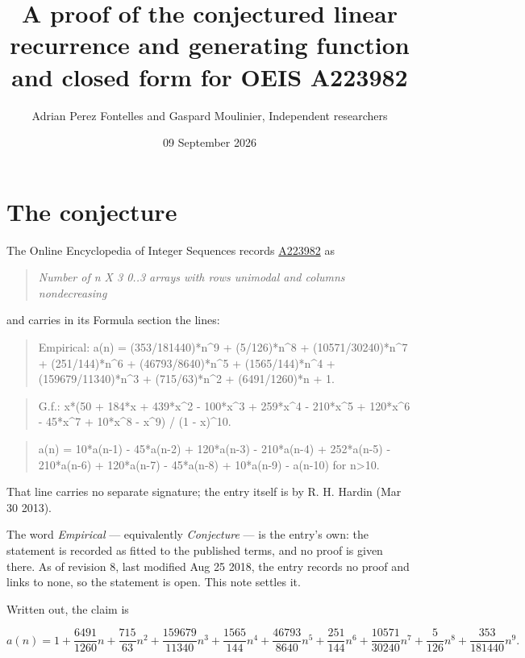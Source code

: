 \documentclass[11pt]{article}
\title{A proof of the conjectured linear recurrence and generating function and closed form for OEIS A223982}
\author{Adrian Perez Fontelles and Gaspard Moulinier, Independent researchers}
\date{09 September 2026}
\theoremstyle{definition}
\begin{document}
\maketitle
\section{The conjecture}

The Online Encyclopedia of Integer Sequences records \href{https://oeis.org/A223982}{A223982} as

\begin{quote}\itshape Number of n X 3 0..3 arrays with rows unimodal and columns nondecreasing\end{quote}

and carries in its Formula section the lines:

\begin{quote}\ttfamily Empirical: a(n) = (353/181440)*n\textasciicircum{}9 + (5/126)*n\textasciicircum{}8 + (10571/30240)*n\textasciicircum{}7 + (251/144)*n\textasciicircum{}6 + (46793/8640)*n\textasciicircum{}5 + (1565/144)*n\textasciicircum{}4 + (159679/11340)*n\textasciicircum{}3 + (715/63)*n\textasciicircum{}2 + (6491/1260)*n + 1.\end{quote}

\begin{quote}\ttfamily G.f.: x*(50 + 184*x + 439*x\textasciicircum{}2 - 100*x\textasciicircum{}3 + 259*x\textasciicircum{}4 - 210*x\textasciicircum{}5 + 120*x\textasciicircum{}6 - 45*x\textasciicircum{}7 + 10*x\textasciicircum{}8 - x\textasciicircum{}9) / (1 - x)\textasciicircum{}10.\end{quote}

\begin{quote}\ttfamily a(n) = 10*a(n-1) - 45*a(n-2) + 120*a(n-3) - 210*a(n-4) + 252*a(n-5) - 210*a(n-6) + 120*a(n-7) - 45*a(n-8) + 10*a(n-9) - a(n-10) for n>10.\end{quote}

That line carries no separate signature; the entry itself is by R. H. Hardin (Mar 30 2013).

The word {\itshape Empirical} --- equivalently {\itshape Conjecture} --- is the entry's own: the statement is recorded as fitted to the published terms, and no proof is given there. As of revision 8, last modified Aug 25 2018, the entry records no proof and links to none, so the statement is open. This note settles it.

Written out, the claim is

\[a(n) = 1 + \frac{6491}{1260}n + \frac{715}{63}n^{2} + \frac{159679}{11340}n^{3} + \frac{1565}{144}n^{4} + \frac{46793}{8640}n^{5} + \frac{251}{144}n^{6} + \frac{10571}{30240}n^{7} + \frac{5}{126}n^{8} + \frac{353}{181440}n^{9}.\]
\end{document}
